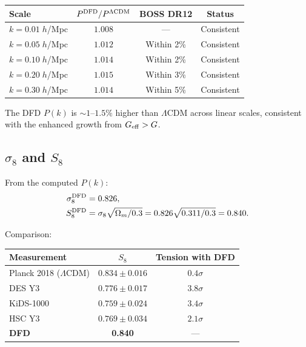 \documentclass[11pt,a4paper]{article}
\theoremstyle{remark}
\begin{document}
\begin{center}
\begin{tabular}{lccc}
\toprule
\textbf{Scale} & \textbf{$P^{\rm DFD}/P^{\Lambda\rm CDM}$} & \textbf{BOSS DR12} & \textbf{Status} \\
\midrule
$k = 0.01\;h$/Mpc & $1.008$ & --- & Consistent \\
$k = 0.05\;h$/Mpc & $1.012$ & Within 2\% & Consistent \\
$k = 0.10\;h$/Mpc & $1.014$ & Within 2\% & Consistent \\
$k = 0.20\;h$/Mpc & $1.015$ & Within 3\% & Consistent \\
$k = 0.30\;h$/Mpc & $1.014$ & Within 5\% & Consistent \\
\bottomrule
\end{tabular}
\end{center}

The DFD $P(k)$ is $\sim 1$--$1.5\%$ higher than $\Lambda$CDM across
linear scales, consistent with the enhanced growth from $G_{\rm eff} > G$.

\subsection{$\sigma_8$ and $S_8$}

From the computed $P(k)$:
\begin{align}
\sigma_8^{\rm DFD} &= 0.826, \\
S_8^{\rm DFD} &= \sigma_8\sqrt{\Omega_m/0.3} = 0.826\sqrt{0.311/0.3} = 0.840.
\end{align}

Comparison:
\begin{center}
\begin{tabular}{lcc}
\toprule
\textbf{Measurement} & \textbf{$S_8$} & \textbf{Tension with DFD} \\
\midrule
Planck 2018 ($\Lambda$CDM) & $0.834 \pm 0.016$ & $0.4\sigma$ \\
DES Y3 & $0.776 \pm 0.017$ & $3.8\sigma$ \\
KiDS-1000 & $0.759 \pm 0.024$ & $3.4\sigma$ \\
HSC Y3 & $0.769 \pm 0.034$ & $2.1\sigma$ \\
\textbf{DFD} & \textbf{0.840} & --- \\
\bottomrule
\end{tabular}
\end{center}
\end{document}
